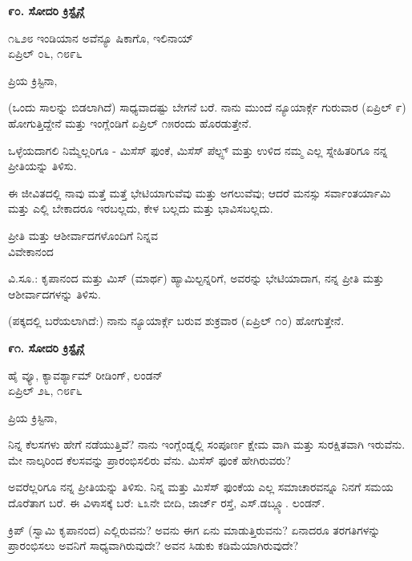 \begin{center}
\textbf{೯೦. ಸೋದರಿ ಕ್ರಿಸ್ಟೈನ್ಗೆ}
\end{center}

\begin{flushright}
೧೬೨೮ ಇಂಡಿಯಾನ ಅವೆನ್ಯೂ ಷಿಕಾಗೊ, ಇಲಿನಾಯ್​\\ಏಪ್ರಿಲ್ ೦೬, ೧೮೯೬
\end{flushright}

ಪ್ರಿಯ ಕ್ರಿಸ್ಟಿನಾ,

(ಒಂದು ಸಾಲನ್ನು ಬಿಡಲಾಗಿದೆ) ಸಾಧ್ಯವಾದಷ್ಟು ಬೇಗನೆ ಬರೆ. ನಾನು ಮುಂದೆ ನ್ಯೂಯಾರ್ಕ್ಗೆ ಗುರುವಾರ (ಏಪ್ರಿಲ್ ೯) ಹೋಗುತ್ತಿದ್ದೇನೆ ಮತ್ತು ಇಂಗ್ಲೆಂಡಿಗೆ ಏಪ್ರಿಲ್ ೧೫ರಂದು ಹೊರಡುತ್ತೇನೆ.

ಒಳ್ಳೆಯದಾಗಲಿ ನಿಮ್ಮೆಲ್ಲರಿಗೂ - ಮಿಸೆಸ್ ಫುಂಕೆ, ಮಿಸೆಸ್ ಪೆಲ್ಪ್ಸ್ ಮತ್ತು ಉಳಿದ ನಮ್ಮ ಎಲ್ಲ ಸ್ನೇಹಿತರಿಗೂ ನನ್ನ ಪ್ರೀತಿಯನ್ನು ತಿಳಿಸು.

ಈ ಜೀವಿತದಲ್ಲಿ ನಾವು ಮತ್ತೆ ಮತ್ತೆ ಭೇಟಿಯಾಗುವೆವು ಮತ್ತು ಅಗಲುವೆವು; ಆದರೆ ಮನಸ್ಸು ಸರ್ವಾಂತರ್ಯಾಮಿ ಮತ್ತು ಎಲ್ಲಿ ಬೇಕಾದರೂ ಇರಬಲ್ಲದು, ಕೇಳ ಬಲ್ಲದು ಮತ್ತು ಭಾವಿಸಬಲ್ಲದು.

\begin{flushright}
ಪ್ರೀತಿ ಮತ್ತು ಆಶೀರ್ವಾದಗಳೊಂದಿಗೆ ನಿನ್ನವ\\ವಿವೇಕಾನಂದ
\end{flushright}

ವಿ.ಸೂ.: ಕೃಪಾನಂದ ಮತ್ತು ಮಿಸ್ (ಮಾರ್ಥ) ಹ್ಯಾಮಿಲ್ಟನ್ನರಿಗೆ, ಅವರನ್ನು ಭೇಟಿಯಾದಾಗ, ನನ್ನ ಪ್ರೀತಿ ಮತ್ತು ಆಶೀರ್ವಾದಗಳನ್ನು ತಿಳಿಸು.

(ಪಕ್ಕದಲ್ಲಿ ಬರೆಯಲಾಗಿದೆ:) ನಾನು ನ್ಯೂಯಾರ್ಕ್ಗೆ ಬರುವ ಶುಕ್ರವಾರ (ಏಪ್ರಿಲ್ ೧೦) ಹೋಗುತ್ತೇನೆ.

\begin{center}
\textbf{೯೧. ಸೋದರಿ ಕ್ರಿಸ್ಟೈನ್ಗೆ}
\end{center}

\begin{flushright}
ಹೈ ವ್ಯೂ, ಕ್ಯಾವರ್ಶ್ಯಾಮ್​ ರೀಡಿಂಗ್, ಲಂಡನ್\\ಏಪ್ರಿಲ್ ೨೬, ೧೮೯೬
\end{flushright}

ಪ್ರಿಯ ಕ್ರಿಸ್ಟಿನಾ,

ನಿನ್ನ ಕೆಲಸಗಳು ಹೇಗೆ ನಡೆಯುತ್ತಿವೆ? ನಾನು ಇಂಗ್ಲೆಂಡ್ನಲ್ಲಿ ಸಂಪೂರ್ಣ ಕ್ಷೇಮ ವಾಗಿ ಮತ್ತು ಸುರಕ್ಷಿತವಾಗಿ ಇರುವೆನು. ಮೇ ನಾಲ್ಕರಿಂದ ಕೆಲಸವನ್ನು ಪ್ರಾರಂಭಿಸಲಿರು ವೆನು. ಮಿಸೆಸ್ ಫುಂಕೆ ಹೇಗಿರುವರು?

ಅವರೆಲ್ಲರಿಗೂ ನನ್ನ ಪ್ರೀತಿಯನ್ನು ತಿಳಿಸು. ನಿನ್ನ ಮತ್ತು ಮಿಸೆಸ್ ಫುಂಕೆಯ ಎಲ್ಲ ಸಮಾಚಾರವನ್ನೂ ನಿನಗೆ ಸಮಯ ದೊರೆತಾಗ ಬರೆ. ಈ ವಿಳಾಸಕ್ಕೆ ಬರೆ: ೬೩ನೇ ಬೀದಿ, ಜಾರ್ಜ್ ರಸ್ತೆ, ಎಸ್.ಡಬ್ಲ್ಯೂ. ಲಂಡನ್.

ಕ್ರಿಪ್ (ಸ್ವಾಮಿ ಕೃಪಾನಂದ) ಎಲ್ಲಿರುವನು? ಅವನು ಈಗ ಏನು ಮಾಡುತ್ತಿರುವನು? ಏನಾದರೂ ತರಗತಿಗಳನ್ನು ಪ್ರಾರಂಭಿಸಲು ಅವನಿಗೆ ಸಾಧ್ಯವಾಗಿರುವುದೇ? ಅವನ ಸಿಡುಕು ಕಡಿಮೆಯಾಗಿರುವುದೇ?

